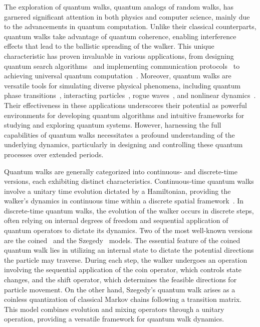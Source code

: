 \documentclass[11pt]{article}
\theoremstyle{plain}
\begin{document}
The exploration of quantum walks, quantum analogs of random walks, has garnered
significant attention in both physics and computer science, mainly due to the
advancements in quantum computation. Unlike their classical counterparts,
quantum walks take advantage of quantum coherence, enabling interference
effects that lead to the ballistic spreading of the walker. This unique
characteristic has proven invaluable in various applications, from designing
quantum search algorithms~\cite{PhysRevA.67.052307,Portugal2018} and
implementing communication protocols~\cite{Shang_2018,8972594} to achieving
universal quantum
computation~\cite{PhysRevA.81.042330,doi:10.1126/science.1229957}. Moreover,
quantum walks are versatile tools for simulating diverse physical phenomena,
including quantum phase transitions~\cite{Cardano2016,PhysRevLett.122.020501},
interacting particles~\cite{PhysRevB.76.155124,doi:10.1126/science.1260364},
rogue waves~\cite{PhysRevA.106.012414,PhysRevA.108.062206}, and nonlinear
dynamics~\cite{PhysRevA.75.062333,PhysRevA.101.023802}. Their effectiveness in
these applications underscores their potential as powerful environments for
developing quantum algorithms and intuitive frameworks for studying and
exploring quantum systems. However, harnessing the full capabilities of quantum
walks necessitates a profound understanding of the underlying dynamics,
particularly in designing and controlling these quantum processes over extended
periods.

Quantum walks are generally categorized into continuous- and discrete-time
versions, each exhibiting distinct characteristics. Continuous-time quantum
walks involve a unitary time evolution dictated by a Hamiltonian, providing the
walker's dynamics in continuous time within a discrete spatial
framework~\cite{PhysRevA.58.915}. In discrete-time quantum walks, the evolution
of the walker occurs in discrete steps, often relying on internal degrees of
freedom and sequential application of quantum operators to dictate its
dynamics. Two of the most well-known versions are the
coined~\cite{PhysRevA.48.1687} and the Szegedy~\cite{1366222} models. The
essential feature of the coined quantum walk lies in utilizing an internal
state to dictate the potential directions the particle may traverse. During
each step, the walker undergoes an operation involving the sequential
application of the coin operator, which controls state changes, and the shift
operator, which determines the feasible directions for particle movement. On
the other hand, Szegedy's quantum walk arises as a coinless quantization of
classical Markov chains following a transition matrix. This model combines
evolution and mixing operators through a unitary operation, providing a
versatile framework for quantum walk dynamics.
\end{document}
